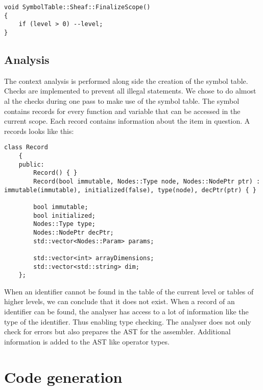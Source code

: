 \documentclass[12pt]{article}
\begin{document}
\begin{lstlisting}
void SymbolTable::Sheaf::FinalizeScope()
{
	if (level > 0) --level;
}
\end{lstlisting}

\subsection{Analysis}

The context analysis is performed along side the creation of the symbol table. Checks are implemented to prevent all illegal statements. We chose to do almost al the checks during one pass to make use of the symbol table. The symbol contains records for every function and variable that can be accessed in the current scope. Each record contains information about the item in question. A records looks like this:

\begin{lstlisting}
class Record
	{
	public:
		Record() { }
		Record(bool immutable, Nodes::Type node, Nodes::NodePtr ptr) : immutable(immutable), initialized(false), type(node), decPtr(ptr) { }

		bool immutable;
		bool initialized;
		Nodes::Type type;
		Nodes::NodePtr decPtr;
		std::vector<Nodes::Param> params;

		std::vector<int> arrayDimensions;
		std::vector<std::string> dim;
	};
\end{lstlisting}

When an identifier cannot be found in the table of the current level or tables of higher levels, we can conclude that it does not exist. When a record of an identifier can be found, the analyser has access to a lot of information like the type of the identifier. Thus enabling type checking. The analyser does not only check for errors but also prepares the AST for the assembler. Additional information is added to the AST like operator types. 

\section{Code generation}

\newpage



\end{document}
